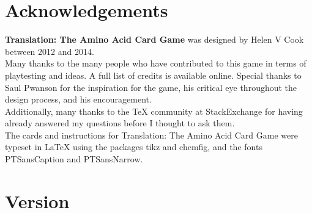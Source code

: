 \documentclass[a4paper,11pt,oneside]{memoir}
\begin{document}
%
%
%
%


\section*{Acknowledgements}

\textbf{Translation: The Amino Acid Card Game} was designed by Helen V Cook between 2012 and 2014.\\

Many thanks to the many people who have contributed to this game in terms of playtesting and ideas.
A full list of credits is available online.
Special thanks to Saul Pwanson for the inspiration for the game, his critical eye throughout the design process, and his encouragement.\\

Additionally, many thanks to the \TeX{} community at StackExchange for having already answered my questions before I thought to ask them. \\

The cards and instructions for Translation: The Amino Acid Card Game were typeset in \textrm{\LaTeX} using the packages tikz and chemfig, and the fonts \widefont PTSansCaption \narrowfont and PTSansNarrow. 

\section*{Version}
\end{document}
